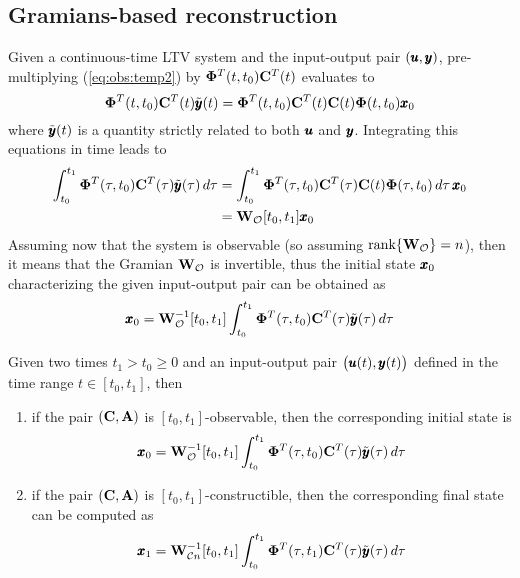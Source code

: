\subsection*{Gramians-based reconstruction}
	Given a continuous-time LTV system and the input-output pair $(\pmb{u},\pmb{y})$, pre-multiplying (\ref{eq:obs:temp2}) by $\mathbf{\Phi}^T(t,t_0)\mathbf{C}^T(t)$ evaluates to
	\[ \mathbf{\Phi}^T(t,t_0)\mathbf{C}^T(t)\tilde {\pmb{y}}(t) = \mathbf{\Phi}^T(t,t_0)\mathbf{C}^T(t)\mathbf{C}(t)\mathbf{\Phi}(t,t_0) \pmb{x}_0 \]
	where $\tilde {\pmb{y}}(t)$ is a quantity strictly related to both $\pmb{u}$ and $\pmb{y}$. Integrating this equations in time leads to
	\begin{align*}
		\int_{t_0}^{t_1} \mathbf{\Phi}^T(\tau,t_0)\mathbf{C}^T(\tau)\tilde {\pmb{y}}(\tau) \, d\tau & = \int_{t_0}^{t_1} \mathbf{\Phi}^T(\tau,t_0)\mathbf{C}^T(\tau)\mathbf{C}(t)\mathbf{\Phi}(\tau,t_0) \, d\tau \, \pmb{x}_0 \\
		& = \mathbf{W}_{\mathcal O}[t_0,t_1]  \pmb{x}_0
	\end{align*}
	Assuming now that the system is observable (so assuming $\textrm{rank}\{\mathbf{W}_{\mathcal O}\} = n$), then it means that the Gramian $\mathbf{W}_{\mathcal O}$ is invertible, thus the initial state $\pmb{x}_0$ characterizing the given input-output pair can be obtained as
	\begin{equation*}
		\pmb{x}_0 = \mathbf{W}_{\mathcal O}^{-1}[t_0,t_1] \int_{t_0}^{t_1} \mathbf{\Phi}^T(\tau,t_0)\mathbf{C}^T(\tau)\tilde {\pmb{y}}(\tau) \, d\tau
	\end{equation*}
	\begin{theorem}
		Given two times $t_1 > t_0 \geq 0$ and an input-output pair $\big(\pmb{u}(t),\pmb{y}(t)\big)$ defined in the time range $t\in [t_0,t_1]$, then
		\begin{enumerate}[\itshape i)]
			\item if the pair $(\mathbf{C},\mathbf{A})$ is $[t_0,t_1]$-observable, then the corresponding initial state is
			\begin{equation}
				\pmb{x}_0 = \mathbf{W}_{\mathcal O}^{-1}[t_0,t_1] \int_{t_0}^{t_1} \mathbf{\Phi}^T(\tau,t_0)\mathbf{C}^T(\tau)\tilde {\pmb{y}}(\tau) \, d\tau
			\end{equation}
			\item if the pair $(\mathbf{C},\mathbf{A})$ is $[t_0,t_1]$-constructible, then the corresponding final state can be computed as
			\begin{equation}
				\pmb{x}_1 = \mathbf{W}_{\mathcal C n}^{-1}[t_0,t_1] \int_{t_0}^{t_1} \mathbf{\Phi}^T(\tau,t_1)\mathbf{C}^T(\tau)\tilde {\pmb{y}}(\tau) \, d\tau
			\end{equation}
		\end{enumerate}
	\end{theorem}

